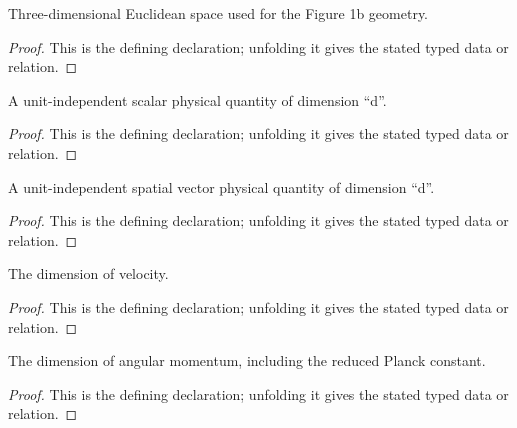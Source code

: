 \begin{definition}[Space]
  \label{decl:physics:IPhO_2026_1_B_1:Space}
  Three-dimensional Euclidean space used for the Figure 1b geometry.
\end{definition}
\begin{proof}
  This is the defining declaration; unfolding it gives the stated typed data or relation.
\end{proof}

\begin{definition}[ScalarQuantity]
  \label{decl:physics:IPhO_2026_1_B_1:ScalarQuantity}
  A unit-independent scalar physical quantity of dimension “d”.
\end{definition}
\begin{proof}
  This is the defining declaration; unfolding it gives the stated typed data or relation.
\end{proof}

\begin{definition}[VectorQuantity]
  \label{decl:physics:IPhO_2026_1_B_1:VectorQuantity}
  A unit-independent spatial vector physical quantity of dimension “d”.
\end{definition}
\begin{proof}
  This is the defining declaration; unfolding it gives the stated typed data or relation.
\end{proof}

\begin{definition}[velocityDimension]
  \label{decl:physics:IPhO_2026_1_B_1:velocityDimension}
  The dimension of velocity.
\end{definition}
\begin{proof}
  This is the defining declaration; unfolding it gives the stated typed data or relation.
\end{proof}

\begin{definition}[angularMomentumDimension]
  \label{decl:physics:IPhO_2026_1_B_1:angularMomentumDimension}
  The dimension of angular momentum, including the reduced Planck constant.
\end{definition}
\begin{proof}
  This is the defining declaration; unfolding it gives the stated typed data or relation.
\end{proof}

